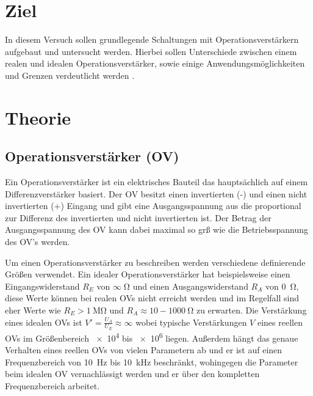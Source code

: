 \section*{Ziel}
    In diesem Versuch sollen grundlegende Schaltungen mit Operationsverstärkern aufgebaut und untersucht werden.
    Hierbei sollen Unterschiede zwischen einem realen und idealen Operationsverstärker, sowie einige Anwendungsmöglichkeiten und Grenzen verdeutlicht werden \cite{anleitung}.
\section{Theorie}
    \label{sec:theorie}
    \subsection{Operationsverstärker (OV)}
    Ein Operationsverstärker ist ein elektrisches Bauteil das hauptsächlich auf einem Differenzverstärker basiert.
    Der OV besitzt einen invertierten (-) und einen nicht invertierten (+) Eingang und gibt eine Ausgangsspannung aus die proportional zur Differenz des invertierten und nicht invertierten ist.
    Der Betrag der Ausgangsspannung des OV kann dabei maximal so grß wie die Betriebsspannung des OV's werden.

    Um einen Operationsverstärker zu beschreiben werden verschiedene definierende Größen verwendet.
    Ein idealer Operationsverstärker hat beispielsweise einen Eingangswiderstand $R_E$ von $\infty \; \si{\ohm}$ und einen Ausgangswiderstand $R_A$ von \SI{0}{\ohm}, diese Werte können bei realen OVs nicht erreicht werden und im Regelfall sind eher Werte wie $R_E > \SI{1}{\mega\ohm}$ und $R_A ≈ \num{10}-\SI{1000}{\ohm}$ zu erwarten.
    Die Verstärkung eines idealen OVs ist $V' = \frac{U_A}{U_E} ≈ \infty$ wobei typische Verstärkungen $V$ eines reellen OVs im Größenbereich \num{e4} bis \num{e6} liegen.
    Außerdem hängt das genaue Verhalten eines reellen OVs von vielen Parametern ab und er ist auf einen Frequenzbereich von \SI{10}{\hertz} bis \SI{10}{\kilo\hertz} beschränkt, wohingegen die Parameter beim idealen OV vernachlässigt werden und er über den kompletten Frequenzbereich arbeitet.
